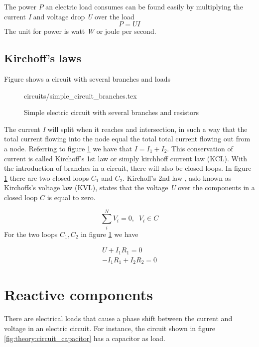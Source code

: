 \documentclass[class=book, crop=false]{standalone}
\begin{document}
The power $P$ an electric load consumes can be found easily by multiplying the current \textit{I} and voltage drop \textit{U} over the load
\begin{equation}\label{eq:theory:apparent_power}
    P = UI
\end{equation}
The unit for power is watt \textit{W} or joule per second.

\subsection{Kirchoff's laws}
Figure shows a circuit with several branches and loads 

\begin{figure}[ht!]
    \centering
    {circuits/simple_circuit_branches.tex}
    \caption{Simple electric circuit with several branches and resistors}
    \label{fig:theory:simple_circuit_branches}
\end{figure}

The current \textit{I} will split when it reaches and intersection, in such a way that the total current flowing into the node equal the total total current flowing out from a node. Referring to figure \ref{fig:theory:simple_circuit_branches} we have that $I = I_1 + I_2$. This conservation of current is called Kirchoff's 1st law or simply kirchhoff current law (KCL). With the introduction of branches in a circuit, there will also be closed loops. In figure \ref{fig:theory:simple_circuit_branches} there are two closed loops $C_{1}$ and $C_{2}$. Kirchoff's 2nd law , aslo known as Kirchoffs's voltage law (KVL), states that the voltage \textit{U} over the components in a closed loop $C$ is equal to zero. 

\begin{equation}\label{eq:theory:kirchoffs_2nd_integral}
    \sum_{i}^{N} V_{i} = 0, \;\; V_{i} \in C
\end{equation}
For the two loops $C_1,C_2$ in figure \ref{fig:theory:simple_circuit_branches} we have 


\begin{equation}
   \begin{aligned}\label{eq:theory:krirchoffs_2nd_ex}
    U + I_{1}R_{1} = 0 
    \\
    -I_{1}R_{1} + I_{2}R_{2} = 0
\end{aligned} 
\end{equation}

\section{Reactive components}
There are electrical loads that cause a phase shift between the current and voltage in an electric circuit. For instance, the circuit shown in figure \ref{fig:theory:circuit_capacitor} has a capacitor as load.
\end{document}
